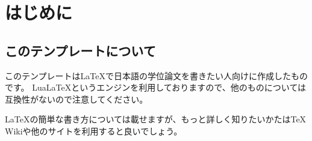 \documentclass[../main]{subfiles}
\begin{document}
\chapter{はじめに}
\section{このテンプレートについて}
%
このテンプレートはLaTeXで日本語の学位論文を書きたい人向けに作成したものです。
LuaLaTeXというエンジンを利用しておりますので、他のものについては互換性がないので注意してください。

LaTeXの簡単な書き方については載せますが、もっと詳しく知りたいかたはTeX Wikiや他のサイトを利用すると良いでしょう。
\end{document}
